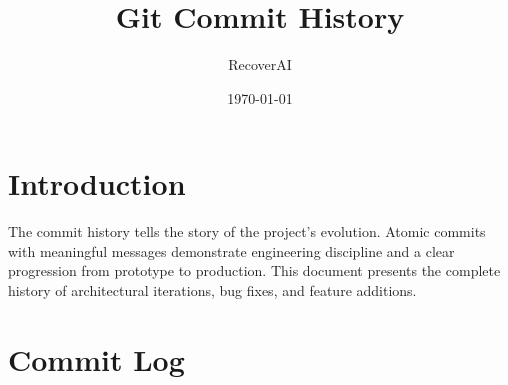 \documentclass[11pt, a4paper]{article}
\title{Git Commit History}
\author{RecoverAI}
\date{\today}
\begin{document}
\maketitle

\section*{Introduction}
The commit history tells the story of the project's evolution. Atomic commits with meaningful messages demonstrate engineering discipline and a clear progression from prototype to production. This document presents the complete history of architectural iterations, bug fixes, and feature additions.

\section*{Commit Log}
\end{document}
